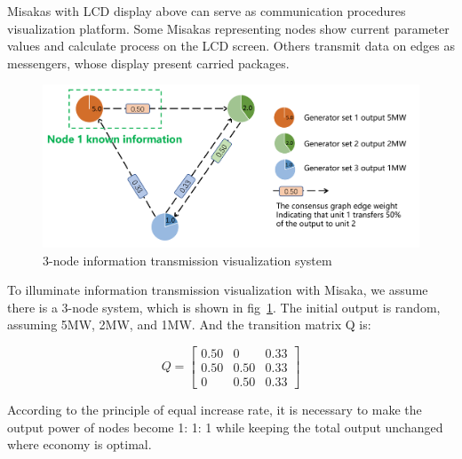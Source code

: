 \documentclass[conference]{IEEEtran}
\begin{document}
Misakas with LCD display above can serve as communication procedures visualization platform. Some Misakas representing nodes show current parameter values and calculate process on the LCD screen. Others transmit data on edges as messengers, whose display present carried packages.

\begin{figure}[htbp]
    \centering
    \includegraphics[width=\columnwidth]{PPT0.png}
    \caption{3-node information transmission visualization system}
    \label{fig:PPT0}
\end{figure}

To illuminate information transmission visualization with Misaka, we assume there is a 3-node system, which is shown in fig~\ref{fig:PPT0}. The initial output is random, assuming 5MW, 2MW, and 1MW. And the transition matrix Q is:

\begin{equation}
    Q=\left[\begin{array}{ccc}
    0.50 & 0 & 0.33 \\
    0.50 & 0.50 & 0.33 \\
    0 & 0.50 & 0.33
    \end{array}\right]
\end{equation}

According to the principle of equal increase rate, it is necessary to make the output power of nodes become 1: 1: 1 while keeping the total output unchanged where economy is optimal.
\end{document}
